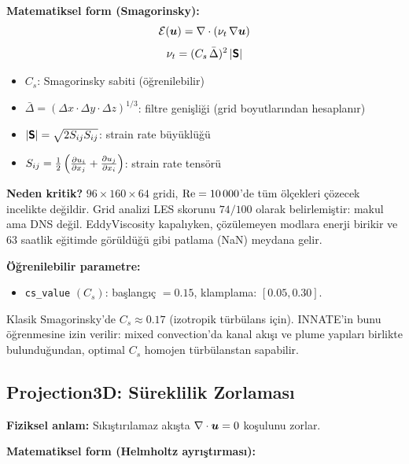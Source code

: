 \textbf{Matematiksel form (Smagorinsky):}
\begin{equation}
    \mathcal{E}(\bm{u}) = \nabla \cdot \left( \nu_t \, \nabla \bm{u} \right)
    \label{eq:eddy_neuron}
\end{equation}
\begin{equation}
    \nu_t = (C_s \, \bar{\Delta})^2 \, |\bm{\mathsf{S}}|
    \label{eq:smagorinsky}
\end{equation}
\begin{itemize}
    \item $C_s$: Smagorinsky sabiti (öğrenilebilir)
    \item $\bar{\Delta} = (\Delta x \cdot \Delta y \cdot \Delta z)^{1/3}$: filtre genişliği (grid boyutlarından hesaplanır)
    \item $|\bm{\mathsf{S}}| = \sqrt{2 S_{ij} S_{ij}}$: strain rate büyüklüğü
    \item $S_{ij} = \frac{1}{2}\left(\frac{\partial u_i}{\partial x_j} + \frac{\partial u_j}{\partial x_i}\right)$: strain rate tensörü
\end{itemize}

\textbf{Neden kritik?} $96 \times 160 \times 64$ gridi, $\mathrm{Re} = 10\,000$'de tüm ölçekleri çözecek incelikte değildir. Grid analizi LES skorunu $74/100$ olarak belirlemiştir: makul ama DNS değil. EddyViscosity kapalıyken, çözülemeyen modlara enerji birikir ve 63 saatlik eğitimde görüldüğü gibi patlama (NaN) meydana gelir.

\textbf{Öğrenilebilir parametre:}
\begin{itemize}
    \item \texttt{cs\_value} $(C_s)$: başlangıç $= 0.15$, klamplama: $[0.05, 0.30]$.
\end{itemize}
Klasik Smagorinsky'de $C_s \approx 0.17$ (izotropik türbülans için). INNATE'in bunu öğrenmesine izin verilir: mixed convection'da kanal akışı ve plume yapıları birlikte bulunduğundan, optimal $C_s$ homojen türbülanstan sapabilir.


\subsection{Projection3D: Süreklilik Zorlaması}
\label{sec:projection_noron}

\textbf{Fiziksel anlam:} Sıkıştırılamaz akışta $\nabla \cdot \bm{u} = 0$ koşulunu zorlar.

\textbf{Matematiksel form (Helmholtz ayrıştırması):}

